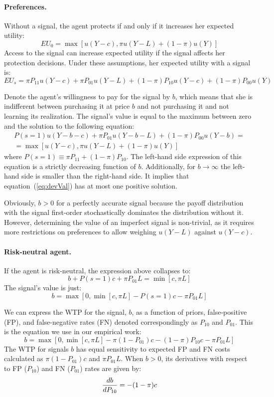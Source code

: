 \documentclass[12pt,a4paper]{article}
\begin{document}
\paragraph{Preferences.} Without a signal, the agent protects if and only if it increases her expected utility:
\[
EU_0=\max[u(Y-c),\pi u(Y-L)+(1-\pi) u(Y)]
\]
Access to the signal can increase expected utility if the signal affects her protection decisions. Under these assumptions, her expected utility with a signal is:
\[
EU_s=\pi P_{11}u(Y-c)+\pi P_{01}u(Y-L)+(1-\pi)P_{10}u(Y-c)+(1-\pi)P_{00}u(Y)
\]

Denote the agent's willingness to pay for the signal by $b$, which means that she is indifferent between purchasing it at price $b$ and not purchasing it and not learning its realization. The signal's value is equal to the maximum between zero and the solution to the following equation:
\begin{equation}\label{eq:devVal}
\begin{split}
P(s=1)u(Y-b-c)+\pi P_{01}u(Y-b-L)+(1-\pi)P_{00}u(Y-b)=\\=\max[u(Y-c),\pi u(Y-L)+(1-\pi) u(Y)] 
\end{split}
\end{equation}
where $P(s=1)\equiv \pi P_{11}+(1-\pi)P_{10}$. The left-hand side expression of this equation is a strictly decreasing function of $b$. Additionally, for $b\rightarrow \infty$ the left-hand side is smaller than the right-hand side. It implies that equation~(\ref{eq:devVal}) has at most one positive solution.

Obviously, $b>0$ for a perfectly accurate signal because the payoff distribution with the signal first-order stochastically dominates the distribution without it. However, determining the value of an imperfect signal is non-trivial, as it requires more restrictions on preferences to allow weighing $u(Y-L)$ against $u(Y-c)$.


\paragraph{Risk-neutral agent.} If the agent is risk-neutral, the expression above collapses to:
\[b+P(s=1)c+\pi P_{01}L=\min[c,\pi L]
\]
The signal's value is just:
\[
b=\max[0,\min[c,\pi L]-P(s=1)c-\pi P_{01}L]
\]

We can express the WTP for the signal, $b$, as a function of priors, false-positive (FP), and false-negative rates (FN) denoted correspondingly as $P_{10}$ and $P_{01}$. This is the equation we use in our empirical work:
\begin{equation}
b=\max[0,\min[c,\pi L]-\pi (1-P_{01})c-(1-\pi)P_{10}c-\pi P_{01}L]
\end{equation}\label{eq:rnWTP}
The WTP for signals $b$ has equal sensitivity to expected FP and FN costs calculated as $\pi (1-P_{01})c$ and $\pi P_{01}L$. When $b>0$, its derivatives with respect to FP ($P_{10}$) and FN ($P_{01}$) rates are given by:
\begin{equation}\label{eq:dWTP_dFP}
{db\over dP_{10}}=-(1-\pi)c
\end{equation}
\end{document}
